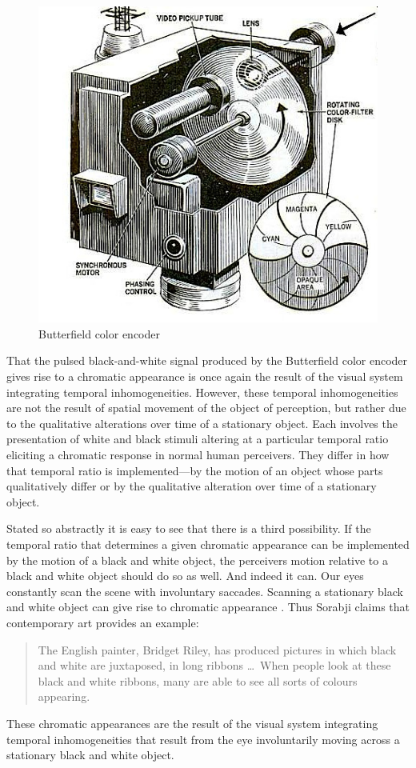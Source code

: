 \begin{figure}[htbp]
    \centering
        \includegraphics[scale=.55]{graphics/color_encoder.jpg}
    \caption{Butterfield color encoder \citep{Shatavsky:1968vn}}
    \label{fig:3}
\end{figure}

That the pulsed black-and-white signal produced by the Butterfield color encoder gives rise to a chromatic appearance is once again the result of the visual system integrating temporal inhomogeneities. However, these temporal inhomogeneities are not the result of spatial movement of the object of perception, but rather due to the qualitative alterations over time of a stationary object. Each involves the presentation of white and black stimuli altering at a particular temporal ratio eliciting a chromatic response in normal human perceivers. They differ in how that temporal ratio is implemented---by the motion of an object whose parts qualitatively differ or by the qualitative alteration over time of a stationary object. 

Stated so abstractly it is easy to see that there is a third possibility. If the temporal ratio that determines a given chromatic appearance can be implemented by the motion of a black and white object, the perceivers motion relative to a black and white object should do so as well. And indeed it can. Our eyes constantly scan the scene with involuntary saccades. Scanning a stationary black and white object can give rise to chromatic appearance \citep[72]{Hardin:1993kn}. Thus Sorabji claims that contemporary art provides an example:
\begin{quote}
    The English painter, Bridget Riley, has produced pictures in which black and white are juxtaposed, in long ribbons \ldots\ When people look at these black and white ribbons, many are able to see all sorts of colours appearing. \citep[295]{Sorabji:2022qf}
\end{quote}
These chromatic appearances are the result of the visual system integrating temporal inhomogeneities that result from the eye involuntarily moving across a stationary black and white object.

